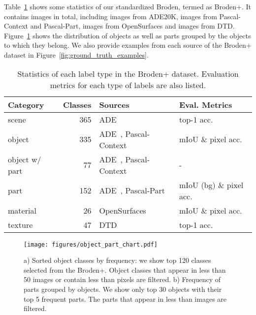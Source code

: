 \documentclass[runningheads]{llncs}
\begin{document}
Table~\ref{tab:modified_broden_label_statistics} shows some statistics of our standardized Broden, termed as Broden+. It contains  images in total, including  images from ADE20K,  images from Pascal-Context and Pascal-Part,  images from OpenSurfaces and  images from DTD. Figure~\ref{fig:object_part_statistics} shows the distribution of objects as well as parts grouped by the objects to which they belong. We also provide examples from each source of the Broden+ dataset in Figure~\ref{fig:ground_truth_examples}. 


\begin{table}[!tbp]
\begin{center}
\setlength{\tabcolsep}{5.8pt}
\begin{tabular}{ l r l l}
\toprule[0.8pt]
\textbf{Category} & \textbf{Classes} & \textbf{Sources} & \textbf{Eval. Metrics} \\
\hline
scene & 365 & ADE~\cite{zhou2017scene} & top-1 acc. \\
object & 335 & ADE~\cite{zhou2017scene}, Pascal-Context\cite{mottaghi_cvpr14} & mIoU \& pixel acc. \\
object w/ part & 77 & ADE~\cite{zhou2017scene}, Pascal-Context\cite{mottaghi_cvpr14} & - \\
part & 152 & ADE~\cite{zhou2017scene}, Pascal-Part~\cite{chen_cvpr14} & mIoU (bg) \& pixel acc. \\
material & 26 & OpenSurfaces~\cite{bell2013opensurfaces} & mIoU \& pixel acc. \\
texture & 47 & DTD~\cite{cimpoi2014describing} & top-1 acc. \\
\bottomrule[0.8pt]
\end{tabular}
\end{center}
\caption{Statistics of each label type in the Broden+ dataset. Evaluation metrics for each type of labels are also listed.}
\label{tab:modified_broden_label_statistics}
\end{table}

\begin{figure}[!t]
\centering
\texttt{[image: figures/object\_part\_chart.pdf]}
\caption{a) Sorted object classes by frequency: we show top 120 classes selected from the Broden+. Object classes that appear in less than 50 images or contain less than  pixels are filtered. b) Frequency of parts grouped by objects. We show only top 30 objects with their top 5 frequent parts. The parts that appear in less than  images are filtered.}
\label{fig:object_part_statistics}
\end{figure}
\end{document}
